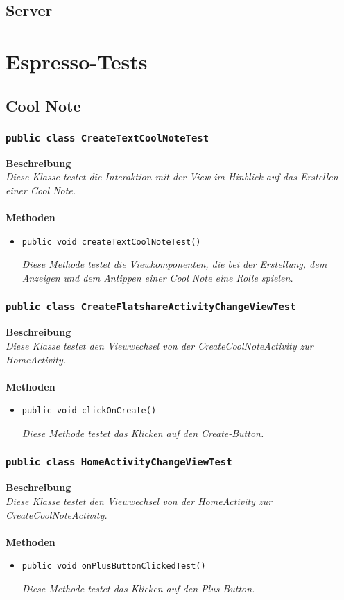 \documentclass[a4paper]{scrreprt}
\begin{document}
	\section{Server}
	
	\chapter{Espresso-Tests}
	\section{Cool Note}
	\subsection{\texttt{public class CreateTextCoolNoteTest}}
	\textbf{Beschreibung}\\
	\textit{Diese Klasse testet die Interaktion mit der View im Hinblick auf das Erstellen einer Cool Note.}\\
	\\
	\textbf{Methoden}
	\begin{itemize}
		
		\item\texttt{{public void createTextCoolNoteTest()}}
		
		\textit{Diese Methode testet die Viewkomponenten, die bei der Erstellung, dem Anzeigen und dem Antippen einer Cool Note eine Rolle spielen.}
		
	\end{itemize}
	\subsection{\texttt{public class CreateFlatshareActivityChangeViewTest}}
	\textbf{Beschreibung}\\
	\textit{Diese Klasse testet den Viewwechsel von der CreateCoolNoteActivity zur HomeActivity.}\\
	\\
	\textbf{Methoden}
	\begin{itemize}
		
		\item\texttt{{public void clickOnCreate()}}
		
		\textit{Diese Methode testet das Klicken auf den Create-Button.}
		
	\end{itemize}	
	\subsection{\texttt{public class HomeActivityChangeViewTest}}
	\textbf{Beschreibung}\\
	\textit{Diese Klasse testet den Viewwechsel von der HomeActivity zur CreateCoolNoteActivity.}\\
	\\
	\textbf{Methoden}
	\begin{itemize}
		
		\item\texttt{{public void onPlusButtonClickedTest()}}
		
		\textit{Diese Methode testet das Klicken auf den Plus-Button.}
		
	\end{itemize}
\end{document}
